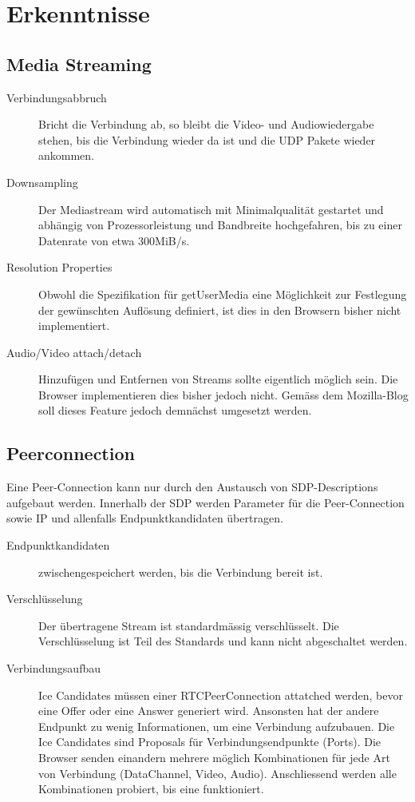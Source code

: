 \chapter{Erkenntnisse}
	\section{Media Streaming}
		\begin{description}
			\item[Verbindungsabbruch] Bricht die Verbindung ab, so bleibt die Video- und Audiowiedergabe stehen, bis die Verbindung wieder da ist und die UDP Pakete wieder ankommen.
		
			\item[Downsampling] Der Mediastream wird automatisch mit Minimalqualität gestartet und abhängig
	 		von Prozessorleistung und Bandbreite hochgefahren, bis zu einer Datenrate von etwa 300MiB/s.
	 		
	 		\item[Resolution Properties] Obwohl die Spezifikation für getUserMedia eine Möglichkeit zur Festlegung der gewünschten Auflösung definiert, ist dies in den Browsern bisher nicht implementiert.
	 		
	 		\item[Audio/Video attach/detach] Hinzufügen und Entfernen von Streams sollte eigentlich möglich sein. Die
	 		Browser implementieren dies bisher jedoch nicht. Gemäss dem Mozilla-Blog soll dieses Feature jedoch demnächst umgesetzt werden.
	 	\end{description}
	 	
	 \section{Peerconnection}
	 	Eine Peer-Connection kann nur durch den Austausch von SDP-Descriptions
	 	aufgebaut werden. Innerhalb der SDP werden Parameter für die Peer-Connection
	 	sowie IP und allenfalls Endpunktkandidaten übertragen.
	 	
	 	\begin{description}
			\item[Endpunktkandidaten] zwischengespeichert werden, bis die Verbindung bereit ist.

			\item[Verschlüsselung] Der übertragene Stream ist standardmässig verschlüsselt. Die Verschlüsselung ist Teil des Standards und kann nicht abgeschaltet werden.
			
			\item[Verbindungsaufbau] Ice Candidates müssen einer RTCPeerConnection attatched werden, bevor eine Offer oder eine Answer generiert wird. Ansonsten hat der andere Endpunkt zu wenig Informationen, um eine Verbindung aufzubauen. Die Ice Candidates sind Proposals für Verbindungsendpunkte (Ports). Die Browser senden einandern mehrere möglich Kombinationen für jede Art von Verbindung (DataChannel, Video, Audio). Anschliessend werden alle Kombinationen probiert, bis eine funktioniert.
	 	\end{description}
	 
